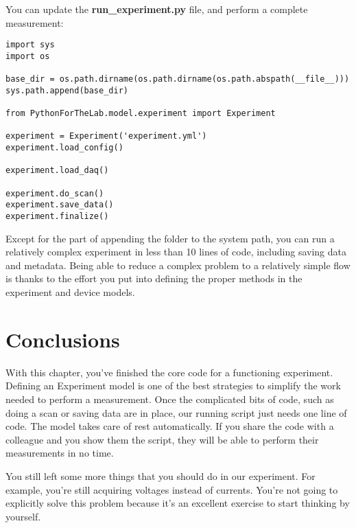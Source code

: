 You can update the \textbf{run\_experiment.py} file, and perform a complete measurement:

\begin{verbatim}
import sys
import os

base_dir = os.path.dirname(os.path.dirname(os.path.abspath(__file__)))
sys.path.append(base_dir)

from PythonForTheLab.model.experiment import Experiment

experiment = Experiment('experiment.yml')
experiment.load_config()

experiment.load_daq()

experiment.do_scan()
experiment.save_data()
experiment.finalize()
\end{verbatim}

Except for the part of appending the folder to the system path, you can run a relatively complex experiment in less than 10 lines of code, including saving data and metadata. Being able to reduce a complex problem to a relatively simple flow is thanks to the effort you put into defining the proper methods in the experiment and device models.

\section{Conclusions}\label{sec:experiment-model-conclusions}
With this chapter, you've finished the core code for a functioning experiment. Defining an Experiment model is one of the best strategies to simplify the work needed to perform a measurement. Once the complicated bits of code, such as doing a scan or saving data are in place, our running script just needs one line of code. The model takes care of rest automatically. If you share the code with a colleague and you show them the  script, they will be able to perform their measurements in no time.

You still left some more things that you should do in our experiment. For example, you're still acquiring voltages instead of currents. You're not going to explicitly solve this problem because it's an excellent exercise to start thinking by yourself.


